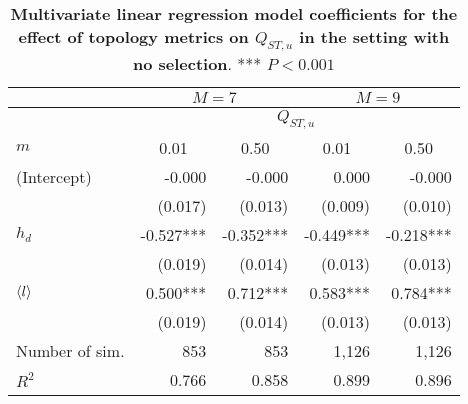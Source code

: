\begin{table}[ht]
  \begin{center}
  \begin{tabular}{|l||r|r|r|r|}
    \hline
    &                                                    \multicolumn{2}{c|}{$M=7$} & \multicolumn{2}{c|}{$M=9$}                                         \\
\hline
    &                                                    \multicolumn{4}{c|}{$Q_{ST,u}$}                                                               \\
\hline
$m$             & \multicolumn{1}{c|}{0.01} & \multicolumn{1}{c|}{0.50}  & \multicolumn{1}{c|}{0.01} & \multicolumn{1}{c|}{0.50} \\
    \hline \hline
    (Intercept) &                   -0.000 &                   -0.000 &                    0.000 &                   -0.000 \\       
                &                  (0.017) &                  (0.013) &                  (0.009) &                  (0.010) \\       
    $h_d$       &                -0.527*** &                -0.352*** &                -0.449*** &                -0.218*** \\       
                &                  (0.019) &                  (0.014) &                  (0.013) &                  (0.013) \\       
    $\langle l \rangle$        &                 0.500*** &                 0.712*** &                 0.583*** &                 0.784*** \\       
                &                  (0.019) &                  (0.014) &                  (0.013) &                  (0.013) \\       
    \hline\hline 
Number of sim.  &                      853 &                      853 &                    1,126 &                    1,126 \\       
    $R^2$       &                    0.766 &                    0.858 &                    0.899 &                    0.896 \\       
    \hline 
    \end{tabular}
  \end{center}
    \caption{ \textbf{Multivariate linear regression model coefficients for the effect of topology metrics on $Q_{ST,u}$ in the setting with no selection}. *** $P < 0.001$}
    \label{tableSI:coefficients_set1}
\end{table}


